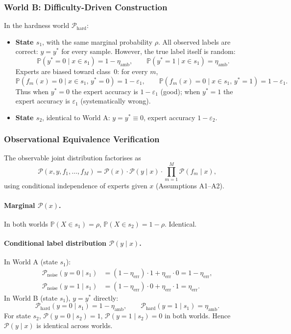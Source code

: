 \subsubsection{World B: Difficulty-Driven Construction}
\label{sec:thm3_worldB}

In the hardness world $\mathcal{P}_{\text{hard}}$:

\begin{itemize}
  \item \textbf{State $s_1$}, with the same marginal probability $\rho$.
    All observed labels are correct: $y=y^*$ for every sample.  However, the
    true label itself is random:
    \[
    \mathbb{P}(y^*=0 \mid x\in s_1)=1-\eta_{\text{amb}},\qquad
    \mathbb{P}(y^*=1 \mid x\in s_1)=\eta_{\text{amb}}.
    \]
    Experts are biased toward class~0: for every $m$,
    \[
    \mathbb{P}(f_m(x)=0 \mid x\in s_1,\,y^*=0)=1-\varepsilon_1,\qquad
    \mathbb{P}(f_m(x)=0 \mid x\in s_1,\,y^*=1)=1-\varepsilon_1.
    \]
    Thus when $y^*=0$ the expert accuracy is $1-\varepsilon_1$ (good); when
    $y^*=1$ the expert accuracy is $\varepsilon_1$ (systematically wrong).
  \item \textbf{State $s_2$}, identical to World A: $y=y^*\equiv0$, expert
    accuracy $1-\varepsilon_2$.
\end{itemize}

\subsubsection{Observational Equivalence Verification}
\label{sec:thm3_verification}

The observable joint distribution factorises as
\[
\mathcal{P}(x,y,f_1,\dots,f_M)
= \mathcal{P}(x)\cdot\mathcal{P}(y\mid x)\cdot\prod_{m=1}^M\mathcal{P}(f_m\mid x),
\]
using conditional independence of experts given $x$ (Assumptions A1--A2).

\paragraph{Marginal $\mathcal{P}(x)$.}
In both worlds $\mathbb{P}(X\in s_1)=\rho$,
$\mathbb{P}(X\in s_2)=1-\rho$.  Identical.

\paragraph{Conditional label distribution $\mathcal{P}(y\mid x)$.}
In World A (state $s_1$):
\[
\begin{aligned}
\mathcal{P}_{\text{noise}}(y=0\mid s_1)
&= (1-\eta_{\text{err}})\cdot1 + \eta_{\text{err}}\cdot0 = 1-\eta_{\text{err}},\\
\mathcal{P}_{\text{noise}}(y=1\mid s_1)
&= (1-\eta_{\text{err}})\cdot0 + \eta_{\text{err}}\cdot1 = \eta_{\text{err}}.
\end{aligned}
\]
In World B (state $s_1$), $y=y^*$ directly:
\[
\mathcal{P}_{\text{hard}}(y=0\mid s_1)=1-\eta_{\text{amb}},\qquad
\mathcal{P}_{\text{hard}}(y=1\mid s_1)=\eta_{\text{amb}}.
\]
For state $s_2$, $\mathcal{P}(y=0\mid s_2)=1$,
$\mathcal{P}(y=1\mid s_2)=0$ in both worlds.  Hence
$\mathcal{P}(y\mid x)$ is identical across worlds.

